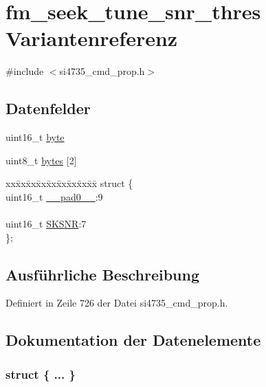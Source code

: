 \hypertarget{unionfm__seek__tune__snr__thres}{}\section{fm\+\_\+seek\+\_\+tune\+\_\+snr\+\_\+thres Variantenreferenz}
\label{unionfm__seek__tune__snr__thres}


{\ttfamily \#include $<$si4735\+\_\+cmd\+\_\+prop.\+h$>$}

\subsection*{Datenfelder}
\begin{DoxyCompactItemize}
\item 
uint16\+\_\+t \hyperlink{unionfm__seek__tune__snr__thres_ab0549c1b5ea980a02e7eab77e21fea49}{byte}
\item 
uint8\+\_\+t \hyperlink{unionfm__seek__tune__snr__thres_a46e4c05d20a047ec169f60d3167e912e}{bytes} \mbox{[}2\mbox{]}
\item 
\begin{tabbing}
xx\=xx\=xx\=xx\=xx\=xx\=xx\=xx\=xx\=\kill
struct \{\\
\>uint16\_t \hyperlink{unionfm__seek__tune__snr__thres_a77132c2c26a75f5b8751b235cda23828}{\_\_pad0\_\_}:9\\
\>\\
\>uint16\_t \hyperlink{unionfm__seek__tune__snr__thres_aa9c8e1fe1b7fa73e35c29242c74fc247}{SKSNR}:7\\
\}; \\

\end{tabbing}\end{DoxyCompactItemize}


\subsection{Ausführliche Beschreibung}


Definiert in Zeile 726 der Datei si4735\+\_\+cmd\+\_\+prop.\+h.



\subsection{Dokumentation der Datenelemente}
\hypertarget{unionfm__seek__tune__snr__thres_aa29d6568712ea4c25d69ef599279ce90}{}\subsubsection[{"@87}]{\setlength{\rightskip}{0pt plus 5cm}struct \{ ... \} }\label{unionfm__seek__tune__snr__thres_aa29d6568712ea4c25d69ef599279ce90}
\hypertarget{unionfm__seek__tune__snr__thres_a77132c2c26a75f5b8751b235cda23828}{}
